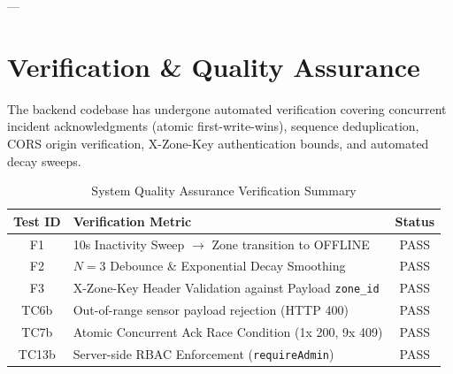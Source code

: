 \documentclass[11pt,a4paper]{article}
\begin{document}
---

\section{Verification \& Quality Assurance}

The backend codebase has undergone automated verification covering concurrent incident acknowledgments (atomic first-write-wins), sequence deduplication, CORS origin verification, X-Zone-Key authentication bounds, and automated decay sweeps.

\begin{table}[H]
\centering
\begin{tabularx}{\textwidth}{c X c}
\toprule
\textbf{Test ID} & \textbf{Verification Metric} & \textbf{Status} \\
\midrule
F1 & 10s Inactivity Sweep $\rightarrow$ Zone transition to OFFLINE & PASS \\
F2 & $N=3$ Debounce \& Exponential Decay Smoothing & PASS \\
F3 & X-Zone-Key Header Validation against Payload \texttt{zone\_id} & PASS \\
TC6b & Out-of-range sensor payload rejection (HTTP 400) & PASS \\
TC7b & Atomic Concurrent Ack Race Condition (1x 200, 9x 409) & PASS \\
TC13b & Server-side RBAC Enforcement (\texttt{requireAdmin}) & PASS \\
\bottomrule
\end{tabularx}
\caption{System Quality Assurance Verification Summary}
\end{table}
\end{document}
